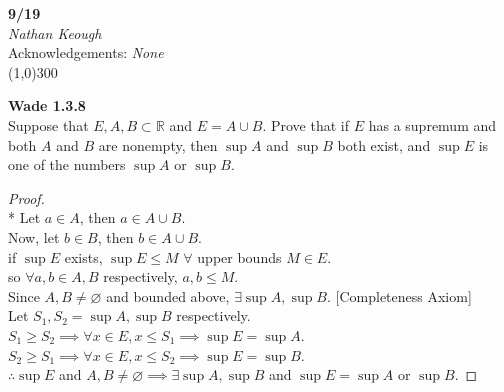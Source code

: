 \documentclass[a4paper]{article}
\newcommand{\real}{\mathbb{R}}
\begin{document}
    \begin{center}
        \Large \textbf{9/19} \\
        \large \textit{Nathan Keough} \\
        Acknowledgements: \emph{None} \vspace{.5pc} \\ \line(1,0){300} 
        \vspace{1pc}
    \end{center} 
    
    \begin{flushleft}
        \textbf{Wade 1.3.8} \\
        Suppose that $E, A, B \subset \real$ and $E = A \cup B$. Prove that if $E$ has a supremum and both $A$ and $B$ are nonempty, then $\sup A$ and $\sup B$ both exist,  
        and $\sup E$ is one of the numbers $\sup A$ or $\sup B$. \\
        \begin{proof}\mbox{}\\*
            Let $a\in A$, then $a \in A \cup B$. \\
            Now, let $b \in B$, then $b \in A \cup B$. \\
            if $\sup E$ exists, $\sup E \leq M$ $ \forall$ upper bounds $M \in E$. \\
            so $\forall a,b \in A,B$ respectively, $a,b \leq M$. \\
            Since $A, B \neq \varnothing$ and bounded above, $\exists \sup A, \sup B$. [Completeness Axiom] \\

            Let $S_1, S_2 = \sup A, \sup B$ respectively. \\
            $S_1 \geq S_2 \implies \forall x \in E, x \leq S_1 \implies \sup E = \sup A$. \\
            $S_2 \geq S_1 \implies \forall x \in E, x \leq S_2 \implies \sup E = \sup B$. \\
            $\therefore \sup E$ and $A,B \neq \varnothing \implies \exists \sup A, \sup B$ and $\sup E = \sup A$ or $\sup B$.
        \end{proof}
        
    \end{flushleft}
\end{document}
